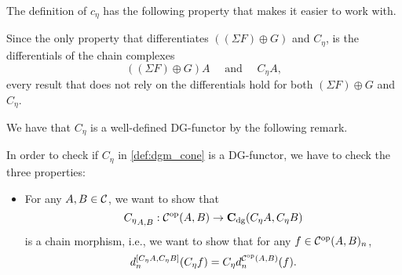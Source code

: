 The definition of \( c_{\eta} \) has the following property that makes it easier to work with.

\begin{remark}
    \label{rem:dgm_c_eta_similar_to_sigma_f_plus_g}
    Since the only property that differentiates \( ((\Sigma F) \oplus G) \) and \( C_{\eta} \), is the differentials of the chain complexes
    \[
        ((\Sigma F) \oplus G) A \quad \text{ and } \quad C_{\eta} A,
    \]
    every result that does not rely on the differentials hold for both \( (\Sigma F) \oplus G \) and \( C_{\eta} \).
\end{remark}

We have that \( C_{\eta} \) is a well-defined DG-functor by the following remark.
\begin{remark}
    In order to check if \( C_{\eta} \) in \autoref{def:dgm_cone} is a DG-functor, we have to check the three properties:
    \begin{itemize}
        \item {
            For any \( A, B \in {\mathcal{C}} \), we want to show that
            \[
                {C_{\eta}}_{A, B}: {\mathcal{C}}^{\operatorname{op}}(A, B) \to \operatorname{\mathbf{C}}_{\operatorname{dg}}(C_{\eta} A, C_{\eta} B)
            \]
            is a chain morphism, i.e., we want to show that for any \( f \in {\mathcal{C}}^{\operatorname{op}}(A, B)_n \),
            \[
                d_n^{[C_{\eta} A, C_{\eta} B]} (C_{\eta} f) = C_{\eta} d_n^{{\mathcal{C}}^{\operatorname{op}}(A, B)}(f).
            \]

}
\end{itemize}
\end{remark}

